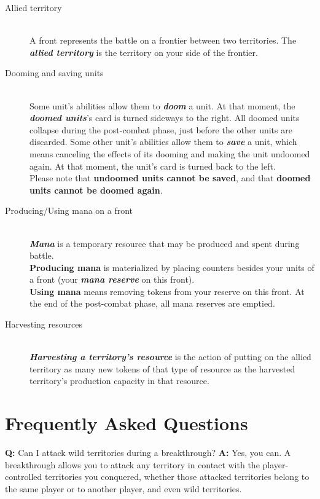 \documentclass[a4paper]{article}
\begin{document}
    \begin{description}
        \item[Allied territory] \hfill \\
        A front represents the battle on a frontier between two territories.
        The \textbf{\textit{allied territory}} is the territory on
        your side of the frontier.
        \item[Dooming and saving units] \hfill \\
        Some unit's abilities allow them to \textbf{\textit{doom}} a unit.
        At that moment, the \textbf{\textit{doomed units}}'s card is turned
        sideways to the right.
        All doomed units collapse during the post-combat phase,
        just before the other units are discarded.
        Some other unit's abilities allow them to \textbf{\textit{save}} a unit,
        which means canceling the effects of its dooming and making the unit
        undoomed again.
        At that moment, the unit's card is turned back to the left.\\
        Please note that \textbf{undoomed units cannot be saved},
        and that \textbf{doomed units cannot be doomed again}.
        \item[Producing/Using mana on a front] \hfill \\
        \textbf{\textit{Mana}} is a temporary resource that may be produced
        and spent during battle.\\
        \textbf{Producing mana} is materialized by placing counters besides your
        units of a front (your \textit{\textbf{mana reserve}} on this front).\\
        \textbf{Using mana} means removing tokens from your reserve on this front.
        At the end of the post-combat phase, all mana reserves are emptied.
        \item[Harvesting resources] \hfill \\
        \textbf{\textit{Harvesting a territory's resource}} is the action of
        putting on the allied territory as many new tokens of that type of resource
        as the harvested territory's production capacity in that resource.
    \end{description}
    

\newpage
\section{Frequently Asked Questions}

    \hspace{-2em}
    \textbf{Q:} Can I attack wild territories during a breakthrough?
    \newline
    \textbf{A:} Yes, you can. A breakthrough allows you to attack any territory in contact
    with the player-controlled territories you conquered, whether those attacked
    territories belong to the same player or to another player, and even wild territories.
\end{document}

